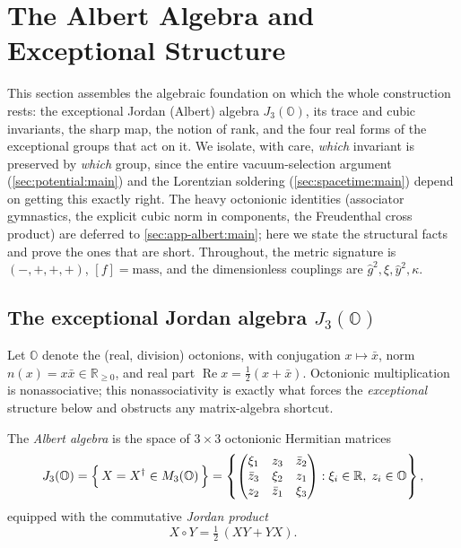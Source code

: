 \section{The Albert Algebra and Exceptional Structure}
\label{sec:albert:main}

This section assembles the algebraic foundation on which the whole
construction rests: the exceptional Jordan (Albert) algebra
$J_{3}(\mathbb{O})$, its trace and cubic invariants, the sharp map, the
notion of rank, and the four real forms of the exceptional groups that
act on it. We isolate, with care, \emph{which} invariant is preserved by
\emph{which} group, since the entire vacuum-selection argument
(\autoref{sec:potential:main}) and the Lorentzian soldering
(\autoref{sec:spacetime:main}) depend on getting this exactly right. The
heavy octonionic identities (associator gymnastics, the explicit cubic
norm in components, the Freudenthal cross product) are deferred to
\autoref{sec:app-albert:main}; here we state the structural facts and prove
the ones that are short. Throughout, the metric signature is
$(-,+,+,+)$, $[f]=\mathrm{mass}$, and the dimensionless couplings are
$\hat g^{2},\xi,\hat y^{2},\kappa$.

\subsection{The exceptional Jordan algebra \texorpdfstring{$J_{3}(\mathbb{O})$}{J3(O)}}
\label{sec:albert:def}

Let $\mathbb{O}$ denote the (real, division) octonions, with conjugation
$x\mapsto \bar x$, norm $n(x)=x\bar x\in\mathbb{R}_{\ge 0}$, and real part
$\operatorname{Re} x=\tfrac12(x+\bar x)$. Octonionic multiplication is
nonassociative; this nonassociativity is exactly what forces the
\emph{exceptional} structure below and obstructs any matrix-algebra
shortcut.

\begin{definition}\label{def:albert:J3O}
The \emph{Albert algebra} is the space of $3\times 3$ octonionic
Hermitian matrices
\begin{equation}\label{eq:albert:J3Odef}
  J_{3}(\mathbb{O})
  =\Bigl\{\,X=X^{\dagger}\in M_{3}(\mathbb{O})\,\Bigr\}
  =\left\{
  \begin{pmatrix}
   \xi_{1} & z_{3} & \bar z_{2}\\
   \bar z_{3} & \xi_{2} & z_{1}\\
   z_{2} & \bar z_{1} & \xi_{3}
  \end{pmatrix}
  : \xi_{i}\in\mathbb{R},\; z_{i}\in\mathbb{O}\right\},
\end{equation}
equipped with the commutative \emph{Jordan product}
\begin{equation}\label{eq:albert:jordanprod}
  X\circ Y=\tfrac12\,(XY+YX).
\end{equation}
\end{definition}

